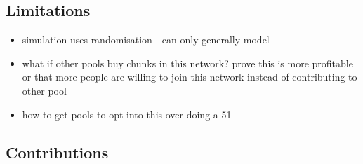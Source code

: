 \subsection{Limitations}

\begin{itemize}
  \item simulation uses randomisation - can only generally model
  \item what if other pools buy chunks in this network? prove this is more profitable or that more people are willing to join this network instead of contributing to other pool
  \item how to get pools to opt into this over doing a 51%
\end{itemize}

\subsection{Contributions}


